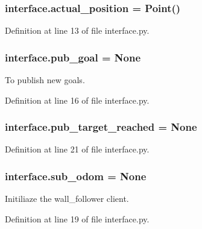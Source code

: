 \subsubsection[{\texorpdfstring{actual\+\_\+position}{actual_position}}]{\setlength{\rightskip}{0pt plus 5cm}interface.\+actual\+\_\+position = Point()}\hypertarget{namespaceinterface_a7e2f9384bca70d8ebd012646492277b3}{}\label{namespaceinterface_a7e2f9384bca70d8ebd012646492277b3}


Definition at line 13 of file interface.\+py.

\subsubsection[{\texorpdfstring{pub\+\_\+goal}{pub_goal}}]{\setlength{\rightskip}{0pt plus 5cm}interface.\+pub\+\_\+goal = None}\hypertarget{namespaceinterface_a1de259b3c06e4f436bbade32c75c9318}{}\label{namespaceinterface_a1de259b3c06e4f436bbade32c75c9318}


To publish new goals. 



Definition at line 16 of file interface.\+py.

\subsubsection[{\texorpdfstring{pub\+\_\+target\+\_\+reached}{pub_target_reached}}]{\setlength{\rightskip}{0pt plus 5cm}interface.\+pub\+\_\+target\+\_\+reached = None}\hypertarget{namespaceinterface_a4709d1a9f45323d007767a3b7c4725f5}{}\label{namespaceinterface_a4709d1a9f45323d007767a3b7c4725f5}


Definition at line 21 of file interface.\+py.

\subsubsection[{\texorpdfstring{sub\+\_\+odom}{sub_odom}}]{\setlength{\rightskip}{0pt plus 5cm}interface.\+sub\+\_\+odom = None}\hypertarget{namespaceinterface_ac9f12ff0de8248506bf532b6874750e7}{}\label{namespaceinterface_ac9f12ff0de8248506bf532b6874750e7}


Initiliaze the wall\+\_\+follower client. 



Definition at line 19 of file interface.\+py.

